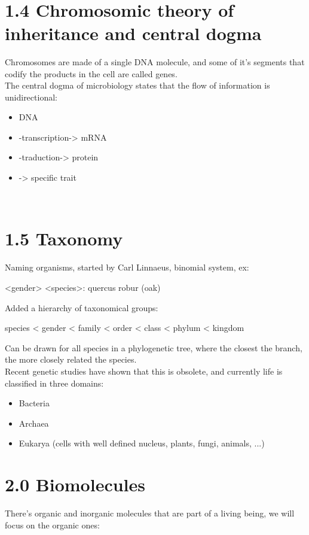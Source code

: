 \documentclass[a4paper,landscape,10pt]{cheatsheet}
\begin{document}
\hfill\\
\section{1.4 Chromosomic theory of inheritance and central dogma}
Chromosomes are made of a single DNA molecule, and some of it's segments that codify the products in the cell are called
genes.\\
The central dogma of microbiology states that the flow of information is unidirectional:
\begin{itemize}
  \item DNA
  \item -transcription-> mRNA
  \item -traduction-> protein
  \item -> specific trait
\end{itemize}

\hfill\\
\section{1.5 Taxonomy}
Naming organisms, started by Carl Linnaeus, binomial system, ex:\\
\begin{center}
  <gender> <species>: quercus robur (oak)
\end{center}
Added a hierarchy of taxonomical groups:\\
\begin{center}
  species < gender < family < order < class < phylum < kingdom
\end{center}
Can be drawn for all species in a phylogenetic tree, where the closest the branch, the more closely related the
species.\\
Recent genetic studies have shown that this is obsolete, and currently life is classified in three domains:
\begin{itemize}
  \item Bacteria
  \item Archaea
  \item Eukarya (cells with well defined nucleus, plants, fungi, animals, ...)
\end{itemize}

\section{2.0 Biomolecules}
There's organic and inorganic molecules that are part of a living being, we will focus on the organic ones:
\end{document}
